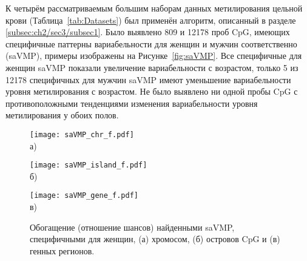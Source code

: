 К четырём рассматриваемым большим наборам данных метилирования цельной крови (Таблица~\ref{tab:Datasets}) был применён алгоритм, описанный в разделе \ref{subsec:ch2/sec3/subsec1}. Было выявлено 809 и 12178 проб CpG, имеющих специфичные паттерны вариабельности для женщин и мужчин соответственно (saVMP), примеры изображены на Рисунке~\ref{fig:saVMP}. Все специфичные для женщин saVMP показали увеличение вариабельности с возрастом, только 5 из 12178 специфичных для мужчин saVMP имеют уменьшение вариабельности уровня метилирования с возрастом. Не было выявлено ни одной пробы CpG с противоположными тенденциями изменения вариабельности уровня метилирования у обоих полов. 

\begin{figure}[ht]
	\begin{minipage}[b][][b]{0.49\linewidth}\centering
		\texttt{[image: saVMP\_chr\_f.pdf]} \\ а)
	\end{minipage}
	\hfill
	\begin{minipage}[b][][b]{0.49\linewidth}\centering
		\texttt{[image: saVMP\_island\_f.pdf]} \\ б)
	\end{minipage}
	\begin{minipage}[b][][b]{0.99\linewidth}\centering
		\texttt{[image: saVMP\_gene\_f.pdf]} \\ в)
	\end{minipage}
	\caption[Обогащение найденными saVMP, специфичными для женщин, хромосом, островов CpG и генных регионов.]{Обогащение (отношение шансов) найденными saVMP, специфичными для женщин, (а) хромосом, (б) островов CpG и (в) генных регионов.}
	\label{fig:saVMP_Fisher_f}
\end{figure}

